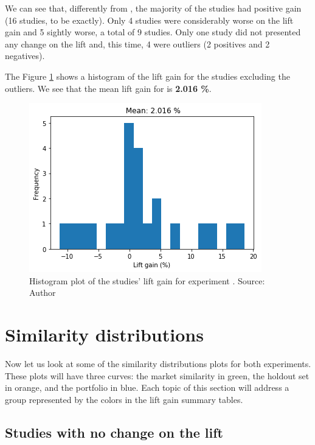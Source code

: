 We can see that, differently from \nameExperimentI{}, the majority of the studies had positive gain (16 studies, to be exactly). Only 4 studies were considerably worse on the lift gain and 5 sightly worse, a total of 9 studies. Only one study did not presented any change on the lift and, this time, 4 were outliers (2 positives and 2 negatives).

The Figure \ref{fig:lift-hist-plot-exp-ii} shows a histogram of the lift gain for the studies excluding the outliers. We see that the mean lift gain for \nameExperimentII{} is \textbf{2.016 \%}.

\begin{figure}[h]
   \centering
   \includegraphics[width=\linewidth]{fig/ch4-lift-hist-plot-exp-ii.png}
   \caption{Histogram plot of the studies' lift gain for experiment \nameExperimentII{}. Source: Author}
   \label{fig:lift-hist-plot-exp-ii}
\end{figure}

\section{Similarity distributions}

Now let us look at some of the similarity distributions plots for both experiments. These plots will have three curves: the market similarity in green, the holdout set in orange, and the portfolio in blue. Each topic of this section will address a group represented by the colors in the lift gain summary tables. 

\subsection{Studies with no change on the lift}

